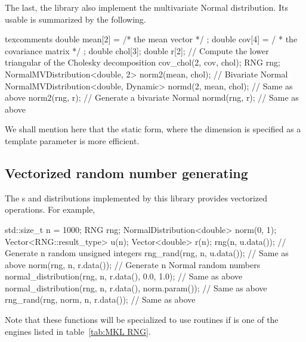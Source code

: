 The last, the library also implement the multivariate Normal distribution. Its
usable is summarized by the following.
\begin{cppcode*}{texcomments}
  double mean[2] = { /* the mean vector */ };
  double cov[4] = { / * the covariance matrix */ };
  double chol[3];
  double r[2];
  // Compute the lower triangular of the Cholesky decomposition
  cov_chol(2, cov, chol);
  RNG rng;
  NormalMVDistribution<double, 2> norm2(mean, chol); // Bivariate Normal
  NormalMVDistribution<double, Dynamic> normd(2, mean, chol); // Same as above
  norm2(rng, r); // Generate a bivariate Normal
  normd(rng, r); // Same as above
\end{cppcode*}
We shall mention here that the static form, where the dimension is specified as
a template parameter is more efficient.

\subsection{Vectorized random number generating}
\label{sub:Vectorized random number generating}

The \rng{}s and distributions implemented by this library provides vectorized
operations. For example,
\begin{cppcode}
  std::size_t n = 1000;
  RNG rng;
  NormalDistribution<double> norm(0, 1);
  Vector<RNG::result_type> u(n);
  Vector<double> r(n);
  rng(n, u.data());           // Generate n random unsigned integers
  rng_rand(rng, n, u.data()); // Same as above
  norm(rng, n, r.data());     // Generate n Normal random numbers
  normal_distribution(rng, n, r.data(), 0.0, 1.0);     // Same as above
  normal_distribution(rng, n, r.data(), norm.param()); // Same as above
  rng_rand(rng, norm, n, r.data());                    // Same as above
\end{cppcode}
Note that these functions will be specialized to use \mkl routines if
 is one of the engines listed in table~\ref{tab:MKL RNG}.
